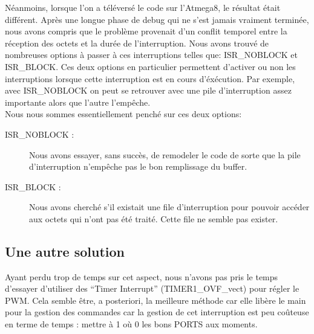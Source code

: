 Néanmoins, lorsque l'on a téléversé le code sur l'Atmega8, le résultat était
différent. Après une longue phase de debug qui ne s'est jamais vraiment terminée,
nous avons compris que le problème provenait d'un conflit temporel entre
la réception des octets et la durée de l'interruption. Nous avons trouvé de 
nombreuses options à passer à ces interruptions telles que: ISR\_NOBLOCK et 
ISR\_BLOCK. Ces deux options en particulier permettent d'activer ou non les 
interruptions lorsque cette interruption est en cours d'éxécution. Par exemple,
avec ISR\_NOBLOCK on peut se retrouver avec une pile d'interruption assez importante
alors que l'autre l'empêche.\\

Nous nous sommes essentiellement penché sur ces deux options:
\begin{description}
\item[ISR\_NOBLOCK :]
  Nous avons essayer, sans succès, de remodeler le code de sorte que la pile
  d'interruption n'empêche pas le bon remplissage du buffer.
\item[ISR\_BLOCK :]
  Nous avons cherché s'il existait une file d'interruption pour pouvoir accéder
  aux octets qui n'ont pas été traité. Cette file ne semble pas exister.
\end{description}

\subsection{Une autre solution}
Ayant perdu trop de temps sur cet aspect, nous n'avons pas pris le temps d'essayer
d'utiliser des ``Timer Interrupt'' (TIMER1\_OVF\_vect) pour régler le PWM.
Cela semble être, a posteriori, la meilleure méthode car elle libère le main pour 
la gestion des commandes car la gestion de cet interruption est peu coûteuse en terme
de temps : mettre à 1 où 0 les bons PORTS aux moments.


